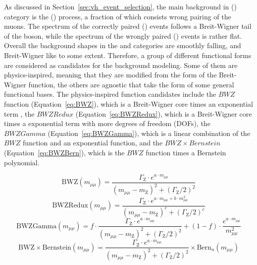 As discussed in Section~\ref{sec:vh_event_selection}, the main background in \WH (\ZH) category is the \WZ (\ZZ) process, 
a fraction of which consists wrong pairing of the muons.
The \mmm spectrum of the correctly paired \WZ (\ZZ) events follows a Breit-Wigner tail of the \PZ boson, 
while the spectrum of the wrongly paired \WZ (\ZZ) events is rather flat.
Overall the background shapes in the \WH and \ZH categories are smoothly falling, and Breit-Wigner like to some extent.
Therefore, a group of different functional forms are considered as candidates for the background modeling.
Some of them are physics-inspired, meaning that they are modified from the form of the Breit-Wigner function, 
the others are agnostic that take the form of some general functional bases.
The physics-inspired function candidates include the $BWZ$ function (Equation~\ref{eq:BWZ}), which is a Breit-Wigner core times an exponential term , 
the $BWZRedux$ (Equation~\ref{eq:BWZRedux}), which is a Breit-Wigner core times a exponential term with more degrees of freedom (DOFs),
the $BWZGamma$ (Equation~\ref{eq:BWZGamma}), which is a linear combination of the $BWZ$ function and an exponential function,
and the $BWZ \times Bernstein$ (Equation~\ref{eq:BWZBern}), which is the $BWZ$ function times a Bernstein polynomial. 


\begin{equation}\label{eq:BWZ}
   \mathrm{BWZ}(m_{\mu\mu}) = \frac{\Gamma_{\mathrm{Z}} \cdot e^{a\cdot m_{\mu\mu}}}{(m_{\mu\mu}-m_{\mathrm{Z}})^2+(\Gamma_{\mathrm{Z}}/2)^{2}}
\end{equation}
\begin{equation}\label{eq:BWZRedux}
   \mathrm{BWZRedux}(m_{\mu\mu}) = \frac{\Gamma_{\mathrm{Z}} \cdot e^{a\cdot m_{\mu\mu}+b \cdot m_{\mu\mu}^2}}{(m_{\mu\mu}-m_{\mathrm{Z}})^c+(\Gamma_{\mathrm{Z}}/2)^{c}}
\end{equation}
\begin{equation}\label{eq:BWZGamma}
   \mathrm{BWZGamma}(m_{\mu\mu}) = f \cdot \frac{\Gamma_{\mathrm{Z}} \cdot e^{a\cdot m_{\mu\mu}}}{(m_{\mu\mu}-m_{\mathrm{Z}})^2+(\Gamma_{\mathrm{Z}}/2)^{2}} + (1-f) \cdot \frac{e^{a\cdot m_{\mu\mu}}}{m_{\mu\mu}^2}
\end{equation} 
\begin{equation}\label{eq:BWZBern}
  \mathrm{BWZ\times Bernstein}(m_{\mu\mu}) = \frac{\Gamma_{\mathrm{Z}} \cdot e^{a\cdot m_{\mu\mu}}}{(m_{\mu\mu}-m_{\mathrm{Z}})^2+(\Gamma_{\mathrm{Z}}/2)^{2}} \times \mathrm{Bern}_{n}(m_{\mu\mu})
\end{equation}

